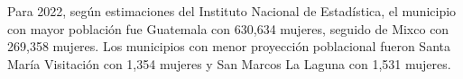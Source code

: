 \justifying Para 2022, según estimaciones del Instituto Nacional de Estadística, el municipio con mayor población fue Guatemala con 630,634 mujeres, seguido de Mixco con 269,358 mujeres. Los municipios con menor proyección poblacional fueron Santa María Visitación con 1,354 mujeres y San Marcos La Laguna con 1,531 mujeres.  